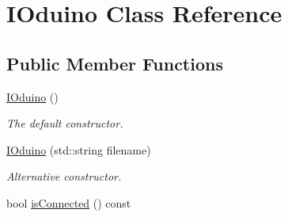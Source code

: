 \hypertarget{classIOduino}{
\section{IOduino Class Reference}
\label{classIOduino}
}
\subsection*{Public Member Functions}
\begin{DoxyCompactItemize}
\item 
\hyperlink{classIOduino_ab4ccbd526cd336d5c5fc53f361ef3dd2}{IOduino} ()
\begin{DoxyCompactList}\small\item\em The default constructor. \item\end{DoxyCompactList}\item 
\hyperlink{classIOduino_aa7454913efdbd714680459a612f9f440}{IOduino} (std::string filename)
\begin{DoxyCompactList}\small\item\em Alternative constructor. \item\end{DoxyCompactList}\item 
\hypertarget{classIOduino_a047d32f2e8d8fd6cfc9cf6f8dd062b26}{
bool \hyperlink{classIOduino_a047d32f2e8d8fd6cfc9cf6f8dd062b26}{isConnected} () const }
\label{classIOduino_a047d32f2e8d8fd6cfc9cf6f8dd062b26}


\end{DoxyCompactItemize}
